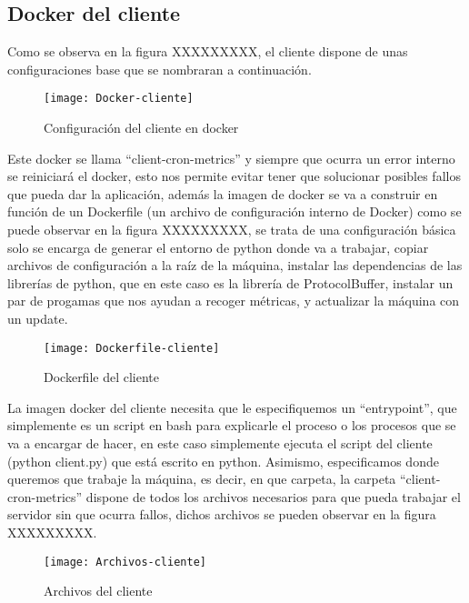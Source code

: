 \documentclass[ spanish, a4paper, 12pt, oneside]{report}
\begin{document}
\subsection{Docker del cliente}
Como se observa en la figura XXXXXXXXX, el cliente dispone de unas configuraciones base que se nombraran a continuación.\\

\begin{figure}[!h]
   \centering
   \texttt{[image: Docker-cliente]}\\
      \caption{\label{fig: Configuración del cliente en docker} Configuración del cliente en docker}
\end{figure}

Este docker se llama ``client-cron-metrics'' y siempre que ocurra un error interno se reiniciará el docker, esto nos permite evitar 
tener que solucionar posibles fallos que pueda dar la aplicación, además la imagen de docker se va a construir en función de un Dockerfile (un archivo de configuración interno de Docker) como se puede observar en la figura XXXXXXXXX, se trata de una configuración básica 
solo se encarga de generar el entorno de python donde va a trabajar, copiar archivos de configuración a la raíz de la máquina, instalar las dependencias de las librerías de python, que en este caso es la librería de ProtocolBuffer, instalar un par de progamas que nos ayudan a recoger métricas, y actualizar 
la máquina con un update. \\

\begin{figure}[!h]
   \centering
   \texttt{[image: Dockerfile-cliente]}\\
      \caption{\label{fig: Dockerfile del cliente} Dockerfile del cliente}
\end{figure}

La imagen docker del cliente necesita que le especifiquemos un ``entrypoint'', que simplemente es un script en bash para explicarle el proceso o los procesos que se va a encargar de hacer, en este caso simplemente ejecuta el script del cliente (python client.py) que está 
escrito en python. Asimismo, especificamos donde queremos que trabaje la máquina, es decir, en que carpeta, la carpeta ``client-cron-metrics'' dispone de todos los archivos necesarios para que pueda trabajar el servidor sin que ocurra fallos, dichos archivos se pueden observar en la figura XXXXXXXXX.\\

\begin{figure}[!h]
   \centering
   \texttt{[image: Archivos-cliente]}\\
      \caption{\label{fig: Archivos del cliente} Archivos del cliente}
\end{figure}
\end{document}

